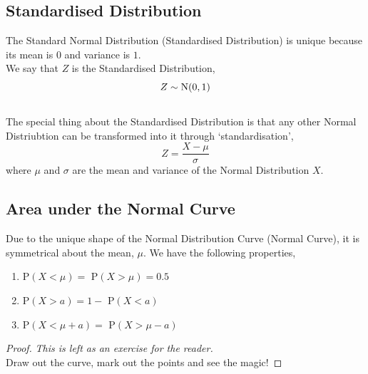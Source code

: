 \documentclass[../setup.tex]{subfiles}
\begin{document}
\subsection{Standardised Distribution}
\begin{theorem}
The Standard Normal Distribution (Standardised Distribution) is unique because its mean is $0$ and variance is $1$. \\
We say that $Z$ is the Standardised Distribution,
\[ Z \sim \textup{N}(0, 1) \] \\
The special thing about the Standardised Distribution is that any other Normal Distriubtion can be transformed into it through `standardisation',
\[ Z = \frac{X-\mu}{\sigma} \]
where $\mu$ and $\sigma$ are the mean and variance of the Normal Distribution $X$.
\end{theorem}

\subsection{Area under the Normal Curve}
Due to the unique shape of the Normal Distribution Curve (Normal Curve), it is symmetrical about the mean, $\mu$. We have the following properties, 
\begin{enumerate}
	\item P$(X < \mu) =$ P$(X > \mu) = 0.5$
	\item P$(X > a) = 1 -$ P$(X < a)$
	\item P$(X < \mu + a) =$ P$(X > \mu - a)$
\end{enumerate} 
\begin{proof} \textit{This is left as an exercise for the reader.} \\ Draw out the curve, mark out the points and see the magic!
\end{proof}
\end{document}

